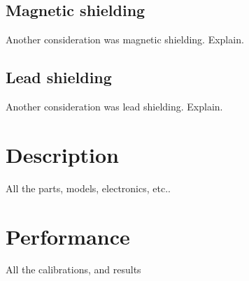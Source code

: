 \documentclass[review]{elsarticle}
\begin{document}
\subsection{Magnetic shielding}
{\color{red}Another consideration was magnetic shielding. Explain.}

\subsection{Lead shielding}
{\color{red}Another consideration was lead shielding. Explain.}


\section{Description}
All the parts, models, electronics, etc..

\section{Performance}
All the calibrations, and results

\clearpage




\iffalse
\end{document}
